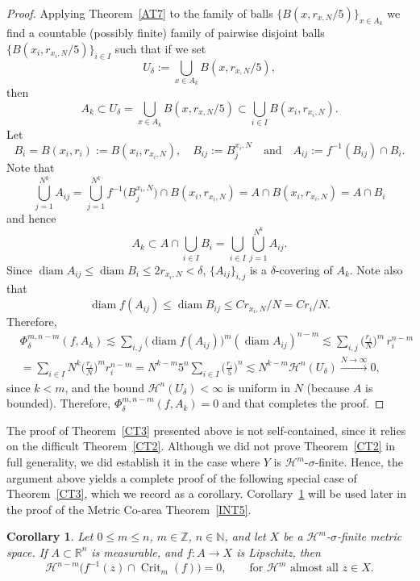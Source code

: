 \documentclass[12pt,leqno]{amsart}
\newtheorem{corollary}[theorem]{Corollary}
\theoremstyle{definition}
\newcommand{\bbbn}{\mathbb N}
\newcommand{\bbbz}{\mathbb Z}
\newcommand{\bbbr}{\mathbb R}
\def\diam{\operatorname{diam}}
\def\H{{\mathcal H}}
\numberwithin{theorem}{section} \numberwithin{equation}{section}
\begin{document}
\begin{proof}
Applying Theorem~\ref{AT7} to the family of balls $\{B(x,r_{x,N}/5)\}_{x\in A_k}$ we find a countable (possibly finite) family of pairwise disjoint balls $\{B(x_i,r_{x_i,N}/5)\}_{i\in I}$ such that if we set
$$
U_\delta:=\bigcup_{x\in A_k} B(x,r_{x,N}/5),
$$
then
$$
A_k\subset U_\delta=\bigcup_{x\in A_k} B(x,r_{x,N}/5)\subset\bigcup_{i\in I} B(x_i,r_{x_i,N}).
$$
Let
$$
B_i=B(x_i,r_i):=B(x_i,r_{x_i,N}),
\quad
B_{ij}:=B_j^{x_i,N}
\quad
\text{and}
\quad
A_{ij}:=f^{-1}(B_{ij})\cap B_i.
$$
Note that
$$
\bigcup_{j=1}^{N^k} A_{ij} = \bigcup_{j=1}^{N^k} f^{-1}\big(B_j^{x_i,N}\big)\cap B(x_i,r_{x_i,N})
=A\cap B(x_i,r_{x_i,N})=A\cap B_i
$$
and hence
$$
A_k\subset A\cap \bigcup_{i\in I}B_i= \bigcup_{i\in I}\bigcup_{j=1}^{N^k} A_{ij}.
$$
Since
$\diam A_{ij}\leq\diam B_i\leq 2r_{x_i,N}<\delta$, $\{A_{ij}\}_{i,j}$ is a $\delta$-covering of $A_k$. Note also that
$$
\diam f(A_{ij})\leq \diam B_{ij}\leq Cr_{x_i,N}/N=Cr_i/N.
$$
Therefore,
\[
\begin{split}
&
\Phi_\delta^{m,n-m}(f,A_k)\lesssim\sum_{i,j}\big(\diam f(A_{ij})\big)^m(\diam A_{ij})^{n-m}
\lesssim
\sum_{i,j}\Big(\frac{r_i}{N}\Big)^m\, r_i^{n-m}\\
&=\sum_{i\in I}N^k\Big(\frac{r_i}{N}\Big)^mr_i^{n-m}
=
N^{k-m}5^n\sum_{i\in I}\Big(\frac{r_i}{5}\Big)^n
\lesssim
N^{k-m}\H^n(U_\delta)\stackrel{N\to\infty}{\longrightarrow} 0,
\end{split}
\]
since $k<m$, and the bound $\H^n(U_\delta)<\infty$ is uniform in $N$ (because $A$ is bounded). Therefore, $\Phi_\delta^{m,n-m}(f,A_k)=0$ and that completes the proof.
\end{proof}

The proof of Theorem~\ref{CT3} presented above is not self-contained, since it relies on the difficult Theorem~\ref{CT2}. Although we did not prove Theorem~\ref{CT2} in full generality, we did establish it in the case where $Y$ is $\H^m$-$\sigma$-finite. Hence, the argument above yields a complete proof of the following special case of Theorem~\ref{CT3}, which we record as a corollary. Corollary~\ref{CT4} will be used later in the proof of the Metric Co-area Theorem~\ref{INT5}.
\begin{corollary}
\label{CT4}
Let $0\leq m\leq n$, $m\in\bbbz$, $n\in\bbbn$, and let $X$ be a $\H^m$-$\sigma$-finite metric space. If $A\subset\bbbr^n$ is measurable, and $f:A\to X$ is Lipschitz, then
$$
\H^{n-m}\big(f^{-1}(z)\cap\operatorname{Crit}_m(f)\big)=0,
\qquad
\text{for } \H^m \text{ almost all } z\in X.
$$
\end{corollary}
\end{document}
